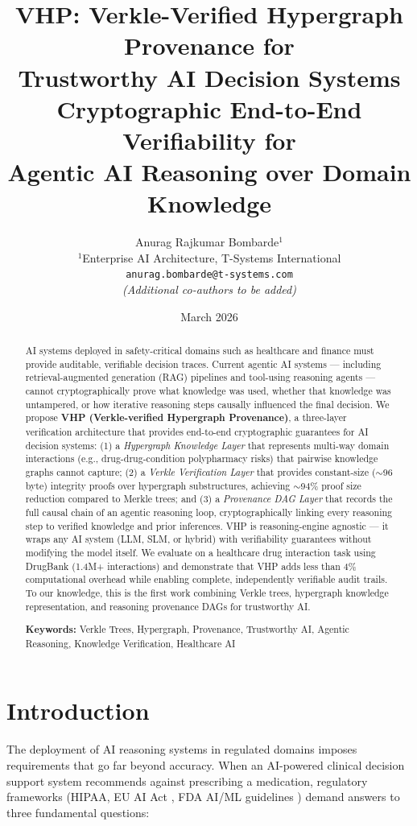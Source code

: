 \documentclass[11pt,a4paper]{article}
\title{
\textbf{VHP: Verkle-Verified Hypergraph Provenance for \\
Trustworthy AI Decision Systems} \\[0.5em]
\large Cryptographic End-to-End Verifiability for \\
Agentic AI Reasoning over Domain Knowledge
}
\author{
Anurag Rajkumar Bombarde$^{1}$ \\
$^{1}$Enterprise AI Architecture, T-Systems International \\
\texttt{anurag.bombarde@t-systems.com} \\[0.5em]
\small \textit{(Additional co-authors to be added)}
}
\date{March 2026}
\begin{document}
\maketitle

\begin{abstract}
AI systems deployed in safety-critical domains such as healthcare and finance must provide auditable, verifiable decision traces. Current agentic AI systems --- including retrieval-augmented generation (RAG) pipelines and tool-using reasoning agents --- cannot cryptographically prove what knowledge was used, whether that knowledge was untampered, or how iterative reasoning steps causally influenced the final decision. We propose \textbf{VHP (Verkle-verified Hypergraph Provenance)}, a three-layer verification architecture that provides end-to-end cryptographic guarantees for AI decision systems: (1) a \textit{Hypergraph Knowledge Layer} that represents multi-way domain interactions (e.g., drug-drug-condition polypharmacy risks) that pairwise knowledge graphs cannot capture; (2) a \textit{Verkle Verification Layer} that provides constant-size ($\sim$96 byte) integrity proofs over hypergraph substructures, achieving $\sim$94\% proof size reduction compared to Merkle trees; and (3) a \textit{Provenance DAG Layer} that records the full causal chain of an agentic reasoning loop, cryptographically linking every reasoning step to verified knowledge and prior inferences. VHP is reasoning-engine agnostic --- it wraps any AI system (LLM, SLM, or hybrid) with verifiability guarantees without modifying the model itself. We evaluate on a healthcare drug interaction task using DrugBank (1.4M+ interactions) and demonstrate that VHP adds less than 4\% computational overhead while enabling complete, independently verifiable audit trails. To our knowledge, this is the first work combining Verkle trees, hypergraph knowledge representation, and reasoning provenance DAGs for trustworthy AI.

\noindent\textbf{Keywords:} Verkle Trees, Hypergraph, Provenance, Trustworthy AI, Agentic Reasoning, Knowledge Verification, Healthcare AI
\end{abstract}

\section{Introduction}
\label{sec:introduction}

The deployment of AI reasoning systems in regulated domains imposes requirements that go far beyond accuracy. When an AI-powered clinical decision support system recommends against prescribing a medication, regulatory frameworks (HIPAA, EU AI Act \citep{euaiact2024}, FDA AI/ML guidelines \citep{fda2021aiml}) demand answers to three fundamental questions:
\end{document}
